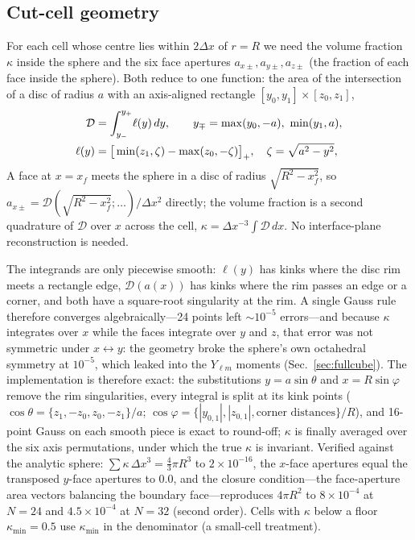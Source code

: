 \documentclass[aps,prd,reprint,amsmath,amssymb,nofootinbib,longbibliography,superscriptaddress]{revtex4-2}
\begin{document}
\subsection{Cut-cell geometry}
\label{sec:cutcell}
For each cell whose centre lies within $2\Delta x$ of $r=R$ we need the volume fraction
$\kappa$ inside the sphere and the six face apertures $a_{x\pm},a_{y\pm},a_{z\pm}$ (the fraction
of each face inside the sphere). Both reduce to one function: the area of the intersection of a
disc of radius $a$ with an axis-aligned rectangle $[y_0,y_1]\times[z_0,z_1]$,
\begin{align}
\mathcal D &= \int_{y_-}^{y_+}\!\ell(y)\,dy,\qquad y_\mp = \max(y_0,-a),\ \min(y_1,a),\notag\\
\ell(y) &= \big[\min(z_1,\zeta) - \max(z_0,-\zeta)\big]_+,\quad \zeta = \sqrt{a^2-y^2},
\end{align}
A face at $x = x_f$ meets the sphere in a disc of radius $\sqrt{R^2-x_f^2}$, so
$a_{x\pm} = \mathcal D(\sqrt{R^2-x_f^2};\ldots)/\Delta x^2$ directly; the volume fraction is a
second quadrature of $\mathcal D$ over $x$ across the cell, $\kappa = \Delta x^{-3}\int\mathcal D\,dx$.
No interface-plane reconstruction is needed.

The integrands are only piecewise smooth: $\ell(y)$ has kinks where the disc rim meets a
rectangle edge, $\mathcal D(a(x))$ has kinks where the rim passes an edge or a corner, and both
have a square-root singularity at the rim. A single Gauss rule therefore converges
algebraically---24 points left $\sim10^{-5}$ errors---and because $\kappa$ integrates over $x$
while the faces integrate over $y$ and $z$, that error was not symmetric under $x\leftrightarrow y$:
the geometry broke the sphere's own octahedral symmetry at $10^{-5}$, which leaked into the
$Y_{\ell m}$ moments (Sec.~\ref{sec:fullcube}). The implementation is therefore exact: the
substitutions $y = a\sin\theta$ and $x = R\sin\varphi$ remove the rim singularities, every
integral is split at its kink points ($\cos\theta = \{z_1,-z_0,z_0,-z_1\}/a$;
$\cos\varphi = \{|y_{0,1}|,|z_{0,1}|,\text{corner distances}\}/R$), and 16-point Gauss on each
smooth piece is exact to round-off; $\kappa$ is finally averaged over the six axis permutations,
under which the true $\kappa$ is invariant. Verified against the analytic sphere:
$\sum\kappa\,\Delta x^3 = \tfrac43\pi R^3$ to $2\times10^{-16}$, the $x$-face apertures equal the
transposed $y$-face apertures to $0.0$, and the closure condition---the face-aperture area
vectors balancing the boundary face---reproduces $4\pi R^2$ to $8\times10^{-4}$ at $N=24$ and
$4.5\times10^{-4}$ at $N=32$ (second order). Cells with $\kappa$ below a floor
$\kappa_{\min} = 0.5$ use $\kappa_{\min}$ in the denominator (a small-cell treatment).
\end{document}
